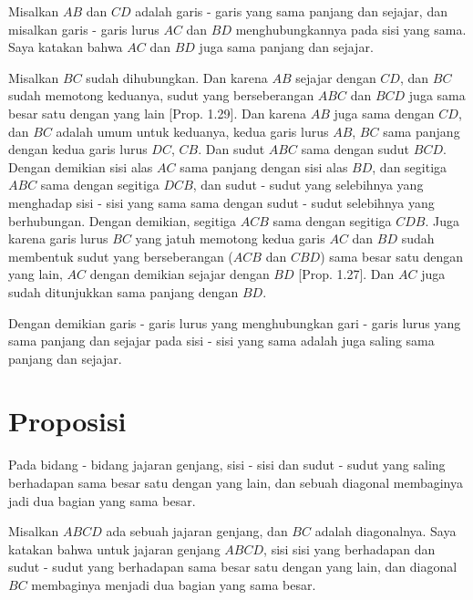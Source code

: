 \documentclass[a4paper]{book}
\begin{document}
Misalkan $AB$ dan $CD$ adalah garis - garis yang sama panjang dan sejajar, dan
misalkan garis - garis lurus $AC$ dan $BD$ menghubungkannya pada sisi yang sama.
Saya katakan bahwa $AC$ dan $BD$ juga sama panjang dan sejajar.

Misalkan $BC$ sudah dihubungkan. Dan karena $AB$ sejajar dengan $CD$, dan $BC$ 
sudah memotong keduanya, sudut yang berseberangan $ABC$ dan $BCD$ juga sama
besar satu dengan yang lain [Prop. 1.29]. Dan karena $AB$ juga sama dengan 
$CD$, dan $BC$ adalah umum untuk keduanya, kedua garis lurus $AB$, $BC$ sama
panjang dengan kedua garis lurus $DC$, $CB$. Dan sudut $ABC$ sama dengan sudut
$BCD$. Dengan demikian sisi alas $AC$ sama panjang dengan sisi alas $BD$, dan 
segitiga $ABC$ sama dengan segitiga $DCB$, dan sudut - sudut yang selebihnya 
yang menghadap sisi - sisi yang sama sama dengan sudut - sudut selebihnya yang 
berhubungan. Dengan demikian, segitiga $ACB$ sama dengan segitiga $CDB$. Juga
karena garis lurus $BC$ yang jatuh memotong kedua garis $AC$ dan $BD$ sudah
membentuk sudut yang berseberangan ($ACB$ dan $CBD$) sama besar satu dengan 
yang lain, $AC$ dengan demikian sejajar dengan $BD$ [Prop. 1.27]. Dan $AC$ 
juga sudah ditunjukkan sama panjang dengan $BD$.

Dengan demikian garis - garis lurus yang menghubungkan gari - garis lurus 
yang sama panjang dan sejajar pada sisi - sisi yang sama adalah juga saling
 sama panjang dan sejajar.  

\section*{\centering Proposisi \thesection} 
Pada bidang - bidang jajaran genjang, sisi - sisi dan sudut - sudut yang 
saling berhadapan sama besar satu dengan yang lain, dan sebuah diagonal 
membaginya jadi dua bagian yang sama besar.  


Misalkan $ABCD$ ada sebuah jajaran genjang, dan $BC$ adalah diagonalnya. 
Saya katakan bahwa untuk jajaran genjang $ABCD$, sisi sisi yang berhadapan 
dan sudut - sudut yang berhadapan sama besar satu dengan yang lain, 
dan diagonal $BC$ membaginya menjadi dua bagian yang sama besar.
\end{document}
